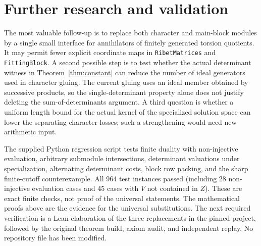 \documentclass[11pt]{article}
\theoremstyle{remark}\newtheorem{remark}[theorem]{Remark}
\begin{document}
\section{Further research and validation}
The most valuable follow-up is to replace both character and main-block modules by a single small interface for annihilators of finitely generated torsion quotients. It may permit fewer explicit coordinate maps in \texttt{RibetMatrices} and \texttt{FittingBlock}. A second possible step is to test whether the actual determinant witness in Theorem~\ref{thm:constant} can reduce the number of ideal generators used in character gluing. The current gluing uses an ideal member obtained by successive products, so the single-determinant property alone does not justify deleting the sum-of-determinants argument. A third question is whether a uniform length bound for the actual kernel of the specialized solution space can lower the separating-character losses; such a strengthening would need new arithmetic input.

The supplied Python regression script tests finite duality with non-injective evaluation, arbitrary submodule intersections, determinant valuations under specialization, alternating determinant costs, block row packing, and the sharp finite-cutoff counterexample. All 964 test instances passed (including 28 non-injective evaluation cases and 45 cases with $V$ not contained in $Z$). These are exact finite checks, not proof of the universal statements. The mathematical proofs above are the evidence for the universal substitutions. The next required verification is a Lean elaboration of the three replacements in the pinned project, followed by the original theorem build, axiom audit, and independent replay. No repository file has been modified.
\end{document}

